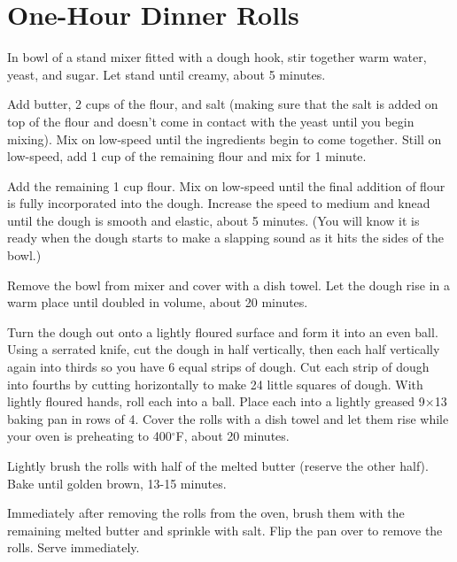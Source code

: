 \section{One-Hour Dinner Rolls}
\begin{recipe}




	In bowl of a stand mixer fitted with a dough hook, stir together warm water, yeast, and sugar. Let stand until creamy, about 5 minutes.

	Add butter, 2 cups of the flour, and salt (making sure that the salt is added on top of the flour and doesn't come in contact with the yeast until you begin mixing). Mix on low-speed until the ingredients begin to come together. Still on low-speed, add 1 cup of the remaining flour and mix for 1 minute.

	Add the remaining 1 cup flour. Mix on low-speed until the final addition of flour is fully incorporated into the dough. Increase the speed to medium and knead until the dough is smooth and elastic, about 5 minutes. (You will know it is ready when the dough starts to make a slapping sound as it hits the sides of the bowl.)

	Remove the bowl from mixer and cover with a dish towel. Let the dough rise in a warm place until doubled in volume, about 20 minutes.

	Turn the dough out onto a lightly floured surface and form it into an even ball. Using a serrated knife, cut the dough in half vertically, then each half vertically again into thirds so you have 6 equal strips of dough. Cut each strip of dough into fourths by cutting horizontally to make 24 little squares of dough. With lightly floured hands, roll each into a ball. Place each into a lightly greased 9×13 baking pan in rows of 4.	Cover the rolls with a dish towel and let them rise while your oven is preheating to 400$^{\circ}$F, about 20 minutes.

	Lightly brush the rolls with half of the melted butter (reserve the other half). Bake until golden brown, 13-15 minutes.

	Immediately after removing the rolls from the oven, brush them with the remaining melted butter and sprinkle with salt. Flip the pan over to remove the rolls. Serve immediately.




\end{recipe}
